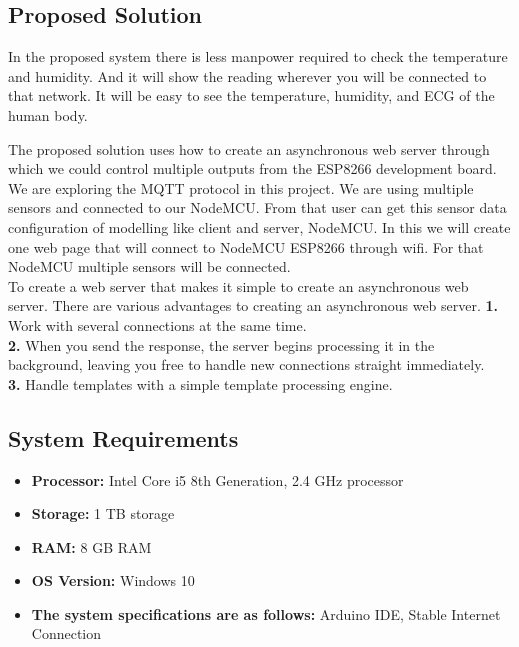 \documentclass[12pt,a4paper,twocolumn,fleqn]{article}
\begin{document}
\subsection{Proposed Solution}
In the proposed system there is less manpower required to check the temperature and humidity. And it will show the reading wherever you will be connected to that network. It will be easy to see the temperature, humidity, and ECG of the human body.

The proposed solution uses how to create an asynchronous web server through which we could control multiple outputs from the ESP8266 development board. We are exploring the MQTT protocol in this project. We are using multiple sensors and connected to our NodeMCU. From that user can get this sensor data configuration of modelling like client and server, NodeMCU. In this we will create one web page that will connect to NodeMCU ESP8266 through wifi. For that NodeMCU multiple sensors will be connected.
\\
To create a web server that makes it simple to create an asynchronous web server. There are various advantages to creating an asynchronous web server. 
\textbf{1.} Work with several connections at the same time. \\

\textbf{2.} When you send the response, the server begins processing it in the background, leaving you free to handle new connections straight immediately. \\

\textbf{3.} Handle templates with a simple template processing engine. \\

\subsection{System Requirements} 
\begin{itemize}
    \item \textbf{Processor:} Intel Core i5 8th Generation, 2.4 GHz processor
    \item \textbf{Storage:}  1 TB storage
    \item \textbf{RAM:}  8 GB RAM  
    \item \textbf{OS Version:} Windows 10 
    \item \textbf{The system specifications are as follows:} Arduino IDE, Stable Internet Connection
\end{itemize}
\newpage
  \pagestyle{fancy}
  \thispagestyle{empty}
  \thispagestyle{plain}
  \fancyhf{}
  \chead{}
\renewcommand{\footrulewidth}{0.4pt}%
\normalsize
\end{document}
